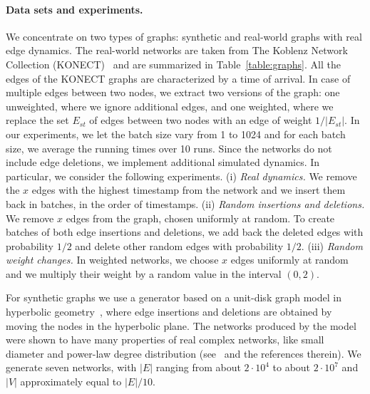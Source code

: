 \documentclass[english]{llncs}
\begin{document}
\paragraph{Data sets and experiments.} We concentrate on two types of graphs: synthetic and real-world graphs with real edge dynamics. The real-world networks are taken from The Koblenz Network Collection (KONECT)~\cite{DBLP:conf/www/Kunegis13} and are summarized in Table~\ref{table:graphs}. All the edges of the KONECT graphs are characterized by a time of arrival. In case of multiple edges between two nodes, we extract two versions of the graph: one unweighted, where we ignore additional edges, and one weighted, where we replace the set  $E_{st}$ of edges between two nodes with an edge of weight $1/|E_{st}|$. 
In our experiments, we let the batch size vary from 1 to 1024 and for each batch size, we average the running times over 10 runs.
Since the networks do not include edge deletions, we implement additional simulated dynamics. In particular, we consider the following experiments. (i) \textit{Real dynamics.} We remove the $x$ edges with the highest timestamp from the network and we insert them back in batches, in the order of timestamps. (ii) \textit{Random insertions and deletions.} We remove $x$ edges from the graph, chosen uniformly at random. To create batches of both edge insertions and deletions, we add back the deleted edges with probability $1/2$ and delete other random edges with probability $1/2$. (iii) \textit{Random weight changes.} In weighted networks, we choose $x$ edges uniformly at random and we multiply their weight by a random 
value in the interval $(0,2)$.

For synthetic graphs we use a generator based on a unit-disk graph model in hyperbolic geometry~\cite{DBLP:journals/corr/LoozSMP15}, where edge insertions and deletions are obtained by moving the nodes in the hyperbolic plane. The networks produced by the model were shown to have many properties of real complex networks, like small diameter and power-law degree distribution (see~\cite{DBLP:journals/corr/LoozSMP15} and the references therein). We generate seven networks, with $|E|$ ranging from about $2\cdot 10^4$ to about $2 \cdot 10^7$ and $|V|$ approximately equal to $|E|/10$.
\end{document}
